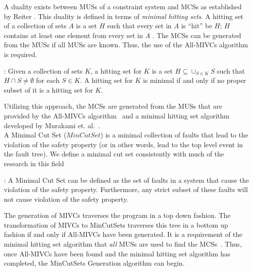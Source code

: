 A duality exists between MUSs of a constraint system and MCSs as established by Reiter \cite{reiter1987theory}. This duality is defined in terms of \textit{minimal hitting sets}. A hitting set of a collection of sets $A$ is a set $H$ such that every set in $A$ is ``hit'' be $H$; $H$ contains at least one element from every set in $A$ \cite{liffiton2016fast}. The MCSs can be generated from the MUSs if all MUSs are known. Thus, the use of the All-MIVCs algorithm is required. 

\begin{definition}: Given a collection of sets $K$, a hitting set for $K$ is a set $H \subseteq \cup_{S \in K} S$ such that $H \cap S \neq \emptyset$ for each $S  \in K$. A hitting set for $K$ is minimal if and only if no proper subset of it is a hitting set for $K$. 
\end{definition}

Utilizing this approach, the MCSs are generated from the MUSs that are provided by the All-MIVCs algorithm~\cite{Ghassabani2017EfficientGO} and a minimal hitting set algorithm developed by Murakami et. al.~\cite{murakami2013efficient,gainer2017minimal}. \\

A Minimal Cut Set ($MinCutSet$) is a minimal collection of faults that lead to the violation of the safety property (or in other words, lead to the top level event in the fault tree). We define a minimal cut set consistently with much of the research in this field~\cite{0f356f05e72f43018211b36f97c8854a,historyFTA}

\begin{definition} :  A Minimal Cut Set can be defined as the set of faults in a system that cause the violation of the safety property. Furthermore, any strict subset of these faults will not cause violation of the safety property. 
\end{definition}

The generation of MIVCs traverses the program in a top down fashion. The transformation of MIVCs to MinCutSets traverses this tree in a bottom up fashion if and only if All-MIVCs have been generated. It is a requirement of the minimal hitting set algorithm that \textit{all} MUSs are used to find the MCSs~\cite{liffiton2016fast,gainer2017minimal,murakami2013efficient}. Thus, once All-MIVCs have been found and the minimal hitting set algorithm has completed, %
the MinCutSets Generation algorithm can begin. 


